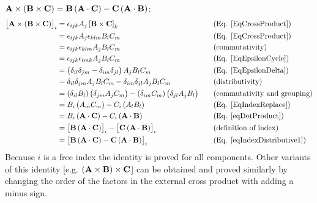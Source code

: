  
$\mathbf{ A}\times\left(\mathbf{ B}\times\mathbf{ C}\right)=\mathbf{ B}\left(\mathbf
{A}\cdot\mathbf{ C}\right)-\mathbf{ C}\left(\mathbf{ A}\cdot\mathbf{ B}\right)$:
\begin{equation}
\begin{aligned}\left[\mathbf{ A}\times\left(\mathbf{ B}\times\mathbf{ C}
\right)\right]_{i} & 
=\epsilon_{ijk}A_{j}\left[\mathbf{ B}\times\mathbf{ C}\right]_{k} & \,\,\,\,\,\, & 
\text{(Eq. \ref{EqCrossProduct})}\\
 & =\epsilon_{ijk}A_{j}\epsilon_{klm}B_{l}C_{m} &  & \text{(Eq. 
\ref{EqCrossProduct})}\\
 & =\epsilon_{ijk}\epsilon_{klm}A_{j}B_{l}C_{m} &  & \text{(commutativity)}\\
 & =\epsilon_{ijk}\epsilon_{lmk}A_{j}B_{l}C_{m} &  & \text{(Eq. 
\ref{EqEpsilonCycle})}\\
 & =\left(\delta_{il}\delta_{jm}-\delta_{im}\delta_{jl}\right)A_{j}B_{l}C_{m} &  
& \text{(Eq. \ref{EqEpsilonDelta})}\\
 & =\delta_{il}\delta_{jm}A_{j}B_{l}C_{m}-\delta_{im}\delta_{jl}A_{j}B_{l}C_{m} 
&  & \text{(distributivity)}\\
 & 
=\left(\delta_{il}B_{l}\right)\left(\delta_{jm}A_{j}C_{m}\right)-\left(\delta_{
im}C_{m}\right)\left(\delta_{jl}A_{j}B_{l}\right) &  & \text{(commutativity and 
grouping)}\\
 & =B_{i}\left(A_{m}C_{m}\right)-C_{i}\left(A_{l}B_{l}\right) &  & \text{(Eq. 
\ref{EqIndexReplace})}\\
 & 
=B_{i}\left(\mathbf{ A}\cdot\mathbf{ C}\right)-C_{i}\left(\mathbf{ A}\cdot\mathbf{ B
}\right) &  & \text{(Eq. \ref{eqDotProduct})}\\
 & 
=\left[\mathbf{ B}\left(\mathbf{ A}\cdot\mathbf{ C}\right)\right]_{i}-\left[\mathbf
{C}\left(\mathbf{ A}\cdot\mathbf{ B}\right)\right]_{i} &  & \text{(definition of 
index)}\\
 & 
=\left[\mathbf{ B}\left(\mathbf{ A}\cdot\mathbf{ C}\right)-\mathbf{ C}\left(\mathbf{ 
A}\cdot\mathbf{ B}\right)\right]_{i} &  & \text{(Eq. \ref{eqIndexDistributive1})}
\end{aligned}
\end{equation}
Because $i$ is a free index the identity is proved for all components.
Other variants of this identity {[}e.g. 
$\left(\mathbf{ A}\times\mathbf{ B}\right)\times\mathbf{ C}${]}
can be obtained and proved similarly by changing the order of the
factors in the external cross product with adding a minus sign.

